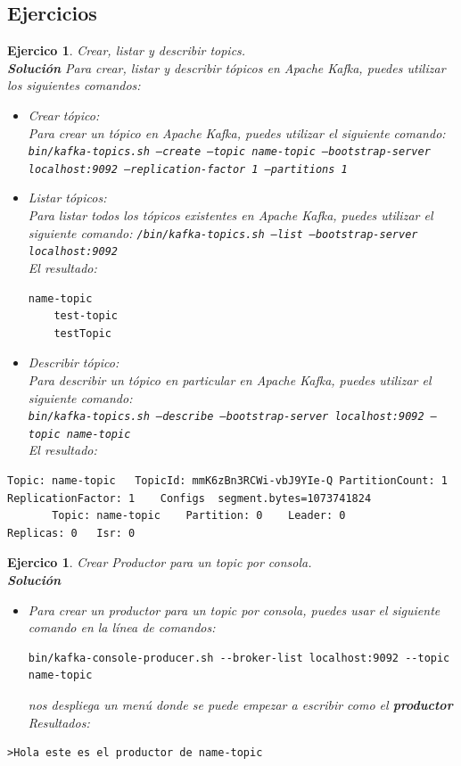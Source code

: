 \documentclass{article}
\newtheorem{ejercicio}[propo]{Ejercico}
\newcommand{\sol}{\textbf{Solución}}
\begin{document}
\subsection{Ejercicios}
\begin{ejercicio}
    Crear, listar y describir topics.\\
    \sol
    Para crear, listar y describir tópicos en Apache Kafka, puedes utilizar los siguientes comandos:
    \begin{itemize}
        \item Crear tópico:\\
            Para crear un tópico en Apache Kafka, puedes utilizar el siguiente comando:\\
            \texttt{bin/kafka-topics.sh --create --topic name-topic --bootstrap-server localhost:9092 --replication-factor 1 --partitions 1}
        \item Listar tópicos:\\
            Para listar todos los tópicos existentes en Apache Kafka, puedes utilizar el siguiente comando:
            \texttt{/bin/kafka-topics.sh --list --bootstrap-server localhost:9092}\\
            El resultado:
\begin{lstlisting}[numbers=none]
    name-topic
    test-topic
    testTopic\end{lstlisting}
        \item Describir tópico:\\
            Para describir un tópico en particular en Apache Kafka, puedes utilizar el siguiente comando:\\
            \texttt{bin/kafka-topics.sh --describe --bootstrap-server localhost:9092 --topic name-topic}\\
            El resultado:
            \end{itemize}
            {\scriptsize
\begin{lstlisting}[numbers=none]
    Topic: name-topic	TopicId: mmK6zBn3RCWi-vbJ9YIe-Q	PartitionCount: 1	ReplicationFactor: 1	Configs  segment.bytes=1073741824
       Topic: name-topic	Partition: 0	Leader: 0	              Replicas: 0	Isr: 0 \end{lstlisting}}
\end{ejercicio}
\begin{ejercicio}
    Crear Productor para un topic por consola.\\
    \sol
    \begin{itemize}
        \item Para crear un productor para un topic por consola, puedes usar el siguiente comando en la línea de comandos:
        \begin{lstlisting}[numbers=none]
            bin/kafka-console-producer.sh --broker-list localhost:9092 --topic name-topic\end{lstlisting}
        nos despliega un menú donde se puede empezar a escribir como el \textbf{productor}\\
        Resultados:
        \end{itemize}
\begin{lstlisting}[numbers=none]
    >Hola este es el productor de name-topic
\end{lstlisting}
\end{ejercicio}
\end{document}
